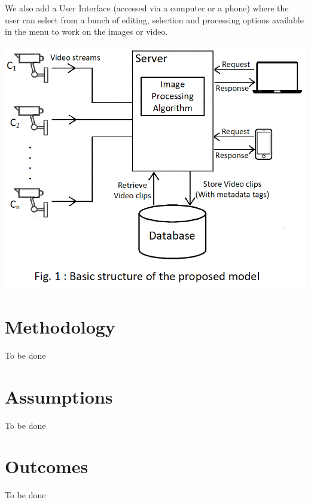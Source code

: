 \documentclass[12pt]{article}
\begin{document}
We also add a User Interface (accessed via a computer or a phone) where the user can select from a bunch of editing, selection and processing options available in the menu to work on the images or video.
\newline

\includegraphics[width=\textwidth]{HighLevelBlockDiagram.png}


\section{Methodology}
To be done


\section{Assumptions}
To be done

\section{Outcomes}
To be done



\end{document}
